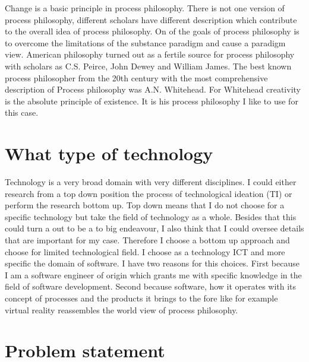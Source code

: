 \documentclass[a4paper]{Thesis}
\begin{document}
Change is a basic principle in process philosophy. There is not one version of process philosophy, different scholars have different description which contribute to the overall idea of process philosophy.
On of the goals of process philosophy is to overcome the limitations of the substance paradigm and cause a paradigm view.
American philosophy turned out as a fertile source for process philosophy with scholars as C.S. Peirce, John Dewey and William James. The best known process philosopher from the 20th century with the most comprehensive description of Process philosophy was A.N. Whitehead. For Whitehead creativity is the absolute principle of existence. It is his process philosophy I like to use for this case.



\section{What type of technology}
Technology is a very broad domain with very different disciplines. 
I could either research from a top down position the process of technological ideation (TI) or perform the research bottom up.
Top down means that I do not choose for a specific technology but take the field of technology as a whole. Besides that this could turn a out to be a to big endeavour, I also think that I could oversee details that are important for my case. Therefore I choose a bottom up  approach and choose for limited technological field.
I choose as a technology ICT and more specific the domain of software. I have two reasons for this choices. First because I am a software engineer of origin which grants me with specific knowledge in the field of software development. Second because software, how it operates with its concept of processes and the products it brings to the fore like for example virtual reality reassembles the world view of process philosophy.


\section{Problem statement}
\end{document}
